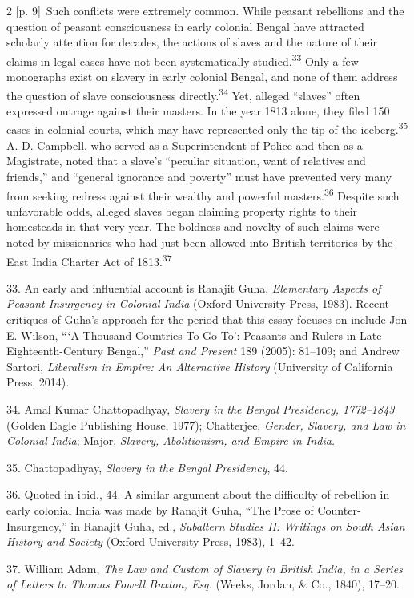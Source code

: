 \documentclass[10pt,a4paper]{article}
\begin{document}
\begin{paracol}{2}
\switchcolumn
{\scriptsize\color{gray} [p. 9]}\ Such conflicts were extremely common. While peasant rebellions and the question of peasant consciousness in early colonial Bengal have attracted scholarly attention for decades, the actions of slaves and the nature of their claims in legal cases have not been systematically studied.\nobreak\textsuperscript{33} Only a few monographs exist on slavery in early colonial Bengal, and none of them address the question of slave consciousness directly.\nobreak\textsuperscript{34} Yet, alleged “slaves” often expressed outrage against their masters. In the year 1813 alone, they filed 150 cases in colonial courts, which may have represented only the tip of the iceberg.\nobreak\textsuperscript{35} A. D. Campbell, who served as a Superintendent of Police and then as a Magistrate, noted that a slave’s “peculiar situation, want of relatives and friends,” and “general ignorance and poverty” must have prevented very many from seeking redress against their wealthy and powerful masters.\nobreak\textsuperscript{36} Despite such unfavorable odds, alleged slaves began claiming property rights to their homesteads in that very year. The boldness and novelty of such claims were noted by missionaries who had just been allowed into British territories by the East India Charter Act of 1813.\nobreak\textsuperscript{37}\par{\small 33. An early and influential account is Ranajit Guha, \textit{Elementary Aspects of Peasant Insurgency in Colonial India} (Oxford University Press, 1983). Recent critiques of Guha’s approach for the period that this essay focuses on include Jon E. Wilson, “‘A Thousand Countries To Go To’: Peasants and Rulers in Late Eighteenth-Century Bengal,” \textit{Past and Present} 189 (2005): 81–109; and Andrew Sartori, \textit{Liberalism in Empire: An Alternative History} (University of California Press, 2014).\par}{\small 34. Amal Kumar Chattopadhyay, \textit{Slavery in the Bengal Presidency, 1772–1843} (Golden Eagle Publishing House, 1977); Chatterjee, \textit{Gender, Slavery, and Law in Colonial India}; Major, \textit{Slavery, Abolitionism, and Empire in India.}\par}{\small 35. Chattopadhyay, \textit{Slavery in the Bengal Presidency}, 44.\par}{\small 36. Quoted in ibid., 44. A similar argument about the difficulty of rebellion in early colonial India was made by Ranajit Guha, “The Prose of Counter-Insurgency,” in Ranajit Guha, ed., \textit{Subaltern Studies II: Writings on South Asian History and Society} (Oxford University Press, 1983), 1–42.\par}{\small 37. William Adam, \textit{The Law and Custom of Slavery in British India, in a Series of Letters to Thomas Fowell Buxton, Esq.} (Weeks, Jordan, \& Co., 1840), 17–20.\par}

\end{paracol}
\end{document}
